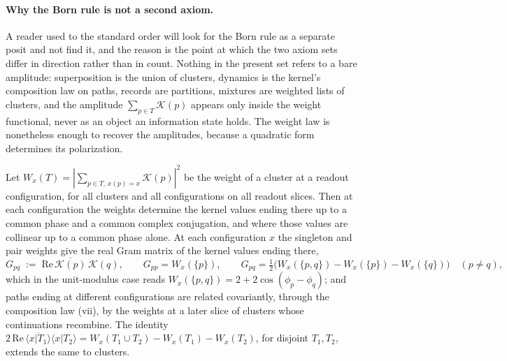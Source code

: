 \paragraph{Why the Born rule is not a second axiom.} A reader used to the standard order will look for the Born rule as a separate posit and not find it, and the reason is the point at which the two axiom sets differ in direction rather than in count. Nothing in the present set refers to a bare amplitude: superposition is the union of clusters, dynamics is the kernel's composition law on paths, records are partitions, mixtures are weighted lists of clusters, and the amplitude $\sum_{p \in T}\mathcal{K}(p)$ appears only inside the weight functional, never as an object an information state holds. The weight law is nonetheless enough to recover the amplitudes, because a quadratic form determines its polarization.
\begin{lemma}\label{lem:polarization}
Let $W_x(T) = |\sum_{p \in T,\, x(p)=x}\mathcal{K}(p)|^2$ be the weight of a cluster at a readout configuration, for all clusters and all configurations on all readout slices. Then at each configuration the weights determine the kernel values ending there up to a common phase and a common complex conjugation, and where those values are collinear up to a common phase alone. At each configuration $x$ the singleton and pair weights give the real Gram matrix of the kernel values ending there,
\begin{equation}\label{eq:gram}
G_{pq} \;:=\; \mathrm{Re}\,\overline{\mathcal{K}(p)}\,\mathcal{K}(q), \qquad G_{pp} = W_x(\{p\}), \qquad G_{pq} = \tfrac12\big(W_x(\{p,q\}) - W_x(\{p\}) - W_x(\{q\})\big) \quad (p \neq q),
\end{equation}
which in the unit-modulus case reads $W_x(\{p,q\}) = 2 + 2\cos(\phi_p - \phi_q)$; and paths ending at different configurations are related covariantly, through the composition law (vii), by the weights at a later slice of clusters whose continuations recombine. The identity $2\,\mathrm{Re}\,\overline{\langle x|T_1\rangle}\langle x|T_2\rangle = W_x(T_1 \cup T_2) - W_x(T_1) - W_x(T_2)$, for disjoint $T_1, T_2$, extends the same to clusters.
\end{lemma}
